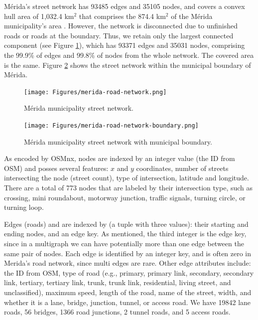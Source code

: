 Mérida's street network has 93485 edges and 35105 nodes, and covers a convex hull area of 1,032.4 km$^2$ that comprises the 874.4 km$^2$ of the Mérida municipality's area \cite{2020census}. However, the network is disconnected due to unfinished roads or roads at the boundary. Thus, we retain only the largest connected component (see Figure \ref{fig:merida-street-network}), which has 93371 edges and 35031 nodes, comprising the 99.9\% of edges and 99.8\% of nodes from the whole network. The covered area is the same. Figure \ref{fig:merida-street-network-boundary} shows the street network within the municipal boundary of Mérida.

\begin{figure}[htpb]
  \centering
  \texttt{[image: Figures/merida-road-network.png]}
  \caption{Mérida municipality street network.
    \label{fig:merida-street-network}}
\end{figure}

\begin{figure}[htpb]
  \centering
  \texttt{[image: Figures/merida-road-network-boundary.png]}
  \caption{Mérida municipality street network with municipal boundary.
    \label{fig:merida-street-network-boundary}}
\end{figure}

As encoded by OSMnx, nodes are indexed by an integer value (the ID from OSM) and posses several features: $x$ and $y$ coordinates, number of streets intersecting the node (street count), type of intersection, latitude and longitude. There are a total of 773 nodes that are labeled by their intersection type, such as crossing, mini roundabout, motorway junction, traffic signals, turning circle, or turning loop.

Edges (roads) and are indexed by (a tuple with three values): their starting and ending nodes, and an edge key. As mentioned, the third integer is the edge key, since in a multigraph we can have potentially more than one edge between the same pair of nodes. Each edge is identified by an integer key, and is often zero in Merida's road network, since multi edges are rare. Other edge attributes include: the ID from OSM, type of road (e.g., primary, primary link, secondary, secondary link, tertiary, tertiary link, trunk, trunk link, residential, living street, and unclassified), maximum speed, length of the road, name of the street, width, and whether it is a lane, bridge, junction, tunnel, or access road. We have 19842 lane roads, 56 bridges, 1366 road junctions, 2 tunnel roads, and 5 access roads.


